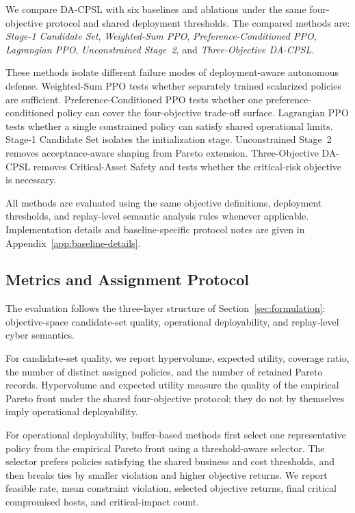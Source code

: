 \documentclass[sigconf,review,anonymous]{acmart}
\begin{document}
We compare DA-CPSL with six baselines and ablations under the
same four-objective protocol and shared deployment thresholds.
The compared methods are:
\emph{Stage-1 Candidate Set},
\emph{Weighted-Sum PPO},
\emph{Preference-Conditioned PPO},
\emph{Lagrangian PPO},
\emph{Unconstrained Stage~2}, and
\emph{Three-Objective DA-CPSL}.

These methods isolate different failure modes of deployment-aware
autonomous defense. Weighted-Sum PPO tests whether separately trained
scalarized policies are sufficient. Preference-Conditioned PPO tests
whether one preference-conditioned policy can cover the four-objective
trade-off surface. Lagrangian PPO tests whether a single constrained
policy can satisfy shared operational limits. Stage-1 Candidate Set
isolates the initialization stage. Unconstrained Stage~2 removes
acceptance-aware shaping from Pareto extension. Three-Objective
DA-CPSL removes Critical-Asset Safety and tests whether the critical-risk
objective is necessary.

All methods are evaluated using the same objective definitions,
deployment thresholds, and replay-level semantic analysis rules whenever
applicable. Implementation details and baseline-specific protocol notes
are given in Appendix~\ref{app:baseline-details}.


\subsection{Metrics and Assignment Protocol}
\label{subsec:eval-metrics}

The evaluation follows the three-layer structure of
Section~\ref{sec:formulation}: objective-space candidate-set quality,
operational deployability, and replay-level cyber semantics.

For candidate-set quality, we report hypervolume, expected utility,
coverage ratio, the number of distinct assigned policies, and the number
of retained Pareto records. Hypervolume and expected utility measure the
quality of the empirical Pareto front under the shared four-objective
protocol; they do not by themselves imply operational deployability.

For operational deployability, buffer-based methods first select one
representative policy from the empirical Pareto front using a
threshold-aware selector. The selector prefers policies satisfying the
shared business and cost thresholds, and then breaks ties by smaller
violation and higher objective returns. We report feasible rate, mean
constraint violation, selected objective returns, final critical
compromised hosts, and critical-impact count.
\end{document}
